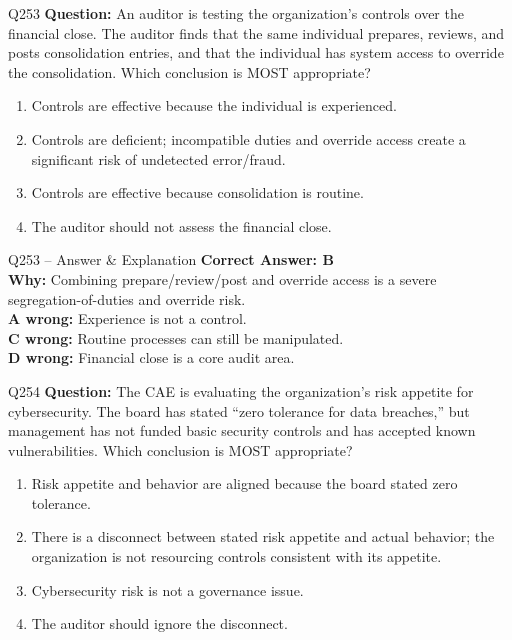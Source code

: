 \documentclass[aspectratio=169,10pt]{beamer}
\begin{document}
	\begin{frame}[t]{Q253}
		\small
		\textbf{Question:} An auditor is testing the organization's controls over the financial close. The auditor finds that the same individual prepares, reviews, and posts consolidation entries, and that the individual has system access to override the consolidation. Which conclusion is MOST appropriate?
		\begin{enumerate}[label=\Alph*.,itemsep=1pt,topsep=2pt]
			\item Controls are effective because the individual is experienced.
			\item Controls are deficient; incompatible duties and override access create a significant risk of undetected error/fraud.
			\item Controls are effective because consolidation is routine.
			\item The auditor should not assess the financial close.
		\end{enumerate}
	\end{frame}
	
	\begin{frame}[t]{Q253 -- Answer \& Explanation}
		\small
		\textbf{Correct Answer: B} \\[4pt]
		\textbf{Why:} Combining prepare/review/post and override access is a severe segregation-of-duties and override risk. \\[4pt]
		\textbf{A wrong:} Experience is not a control. \\[2pt]
		\textbf{C wrong:} Routine processes can still be manipulated. \\[2pt]
		\textbf{D wrong:} Financial close is a core audit area.
	\end{frame}
	
	\begin{frame}[t]{Q254}
		\small
		\textbf{Question:} The CAE is evaluating the organization's risk appetite for cybersecurity. The board has stated ``zero tolerance for data breaches,'' but management has not funded basic security controls and has accepted known vulnerabilities. Which conclusion is MOST appropriate?
		\begin{enumerate}[label=\Alph*.,itemsep=1pt,topsep=2pt]
			\item Risk appetite and behavior are aligned because the board stated zero tolerance.
			\item There is a disconnect between stated risk appetite and actual behavior; the organization is not resourcing controls consistent with its appetite.
			\item Cybersecurity risk is not a governance issue.
			\item The auditor should ignore the disconnect.
		\end{enumerate}
	\end{frame}
	
\end{document}

